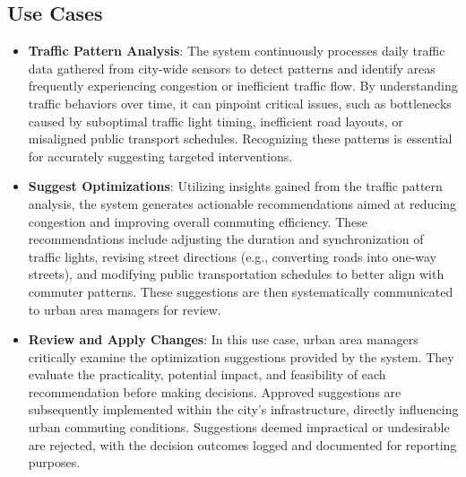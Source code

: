 \documentclass[a4paper,12pt]{article}
\begin{document}
\subsection{Use Cases}
\begin{itemize}
    \item \textbf{Traffic Pattern Analysis}: The system continuously processes daily traffic data gathered from city-wide sensors to detect patterns and identify areas frequently experiencing congestion or inefficient traffic flow. By understanding traffic behaviors over time, it can pinpoint critical issues, such as bottlenecks caused by suboptimal traffic light timing, inefficient road layouts, or misaligned public transport schedules. Recognizing these patterns is essential for accurately suggesting targeted interventions.
    \item \textbf{Suggest Optimizations}: Utilizing insights gained from the traffic pattern analysis, the system generates actionable recommendations aimed at reducing congestion and improving overall commuting efficiency. These recommendations include adjusting the duration and synchronization of traffic lights, revising street directions (e.g., converting roads into one-way streets), and modifying public transportation schedules to better align with commuter patterns. These suggestions are then systematically communicated to urban area managers for review.
    \item \textbf{Review and Apply Changes}: In this use case, urban area managers critically examine the optimization suggestions provided by the system. They evaluate the practicality, potential impact, and feasibility of each recommendation before making decisions. Approved suggestions are subsequently implemented within the city’s infrastructure, directly influencing urban commuting conditions. Suggestions deemed impractical or undesirable are rejected, with the decision outcomes logged and documented for reporting purposes.
\end{itemize}
\end{document}
